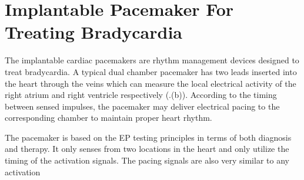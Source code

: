\section{Implantable Pacemaker For Treating Bradycardia}
The implantable cardiac pacemakers are rhythm management devices designed to treat bradycardia. A typical dual chamber pacemaker has two leads inserted into the heart through the veins which can measure the local electrical activity of the right atrium and right ventricle respectively (.(b)). According to the timing between sensed impulses, the pacemaker may deliver electrical pacing to the corresponding chamber to maintain proper heart rhythm.

The pacemaker is based on the EP testing principles in terms of both diagnosis and therapy. It only senses from two locations in the heart and only utilize the timing of the activation signals. The pacing signals are also very similar to any activation 
%
%
